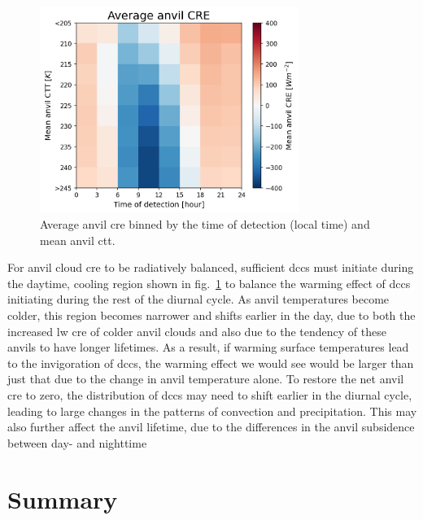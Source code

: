 \begin{figure}[tp]
    \centering
    \includegraphics[width=0.75\textwidth]{figures/ch3_13.png}
    \caption[
    Average anvil \acrshort{cre} binned by the time of detection (local time) and mean anvil \acrshort{ctt}
    ]{
    Average anvil \acrshort{cre} binned by the time of detection (local time) and mean anvil \acrshort{ctt}.
    }
    \label{fig:anvil_cre_time_vs_ctt}
\end{figure}


For anvil cloud \acrshort{cre} to be radiatively balanced, sufficient \acrshort{dcc}s must initiate during the daytime, cooling region shown in fig.~\ref{fig:anvil_cre_time_vs_ctt} to balance the warming effect of \acrshort{dcc}s initiating during the rest of the diurnal cycle. 
As anvil temperatures become colder, this region becomes narrower and shifts earlier in the day, due to both the increased \acrshort{lw} \acrshort{cre} of colder anvil clouds and also due to the tendency of these anvils to have longer lifetimes. 
As a result, if warming surface temperatures lead to the invigoration of \acrshort{dcc}s, the warming effect we would see would be larger than just that due to the change in anvil temperature alone. 
To restore the net anvil \acrshort{cre} to zero, the distribution of \acrshort{dcc}s may need to shift earlier in the diurnal cycle, leading to large changes in the patterns of convection and precipitation. 
This may also further affect the anvil lifetime, due to the differences in the anvil subsidence between day- and nighttime \citep{sokol_tropical_2020}



\section{Summary}  %

